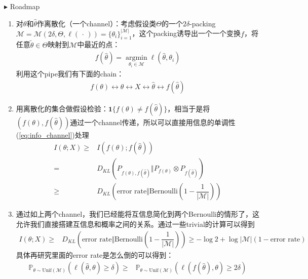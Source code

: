 \documentclass[11pt,a4paper]{ctexart}
\numberwithin{equation}{section}%
\newenvironment{point}{\raggedright$\blacktriangleright$}{}
\begin{document}
\begin{point}
    Roadmap
\end{point}




\begin{enumerate}[topsep=2pt,itemsep=0pt]
    \item 对$ \theta  $和$ \hat{\theta } $作离散化（一个channel）：考虑假设类$ \Theta  $的一个$ 2\delta  $-packing $ \mathcal{M}=\mathcal{M}(2\delta ,\Theta, \ell(\, \cdot \, ))=\{\theta _i\}_{i=1}^{\left\vert \mathcal{M} \right\vert } $，这个packing诱导出一个一个变换$ f $，将任意$ \tilde{\theta }\in\Theta  $映射到$ \mathcal{M} $中最近的点：
    \begin{align*}
        f(\hat{\theta })= \mathop{ \arg\min  }\limits_{\theta _i\in \mathcal{M}} \ell(\hat{\theta },\theta _i)  
    \end{align*}
    利用这个pipe我们有下面的chain：
    \begin{align*}
        f(\theta ) \leftrightarrow \theta \leftrightarrow X \leftrightarrow \hat{\theta } \leftrightarrow f(\hat{\theta }) 
    \end{align*}
    \item 用离散化的集合做假设检验：$ \mathbf{1}\{f(\theta )\neq f(\hat{\theta })\} $，相当于是将$ (f(\theta ),f(\hat{\theta })) $通过一个channel传递，所以可以直接用信息的单调性(\ref{eq:info_channel})处理
    \begin{align*}
        I(\theta ;X)\geq& I(f(\theta ) ;f(\hat{\theta }))\\
        =& D_{KL}(P_{f(\theta ),f(\hat{\theta })}\Vert P_{f(\theta )}\otimes P_{f(\hat{\theta })})\\
        \geq & D_{KL}(\text{error rate}\Vert \mathrm{ Bernoulli }(1-\dfrac{ 1 }{ \left\vert \mathcal{M} \right\vert  }  ))  
    \end{align*}
    \item 通过如上两个channel，我们已经能将互信息简化到两个Bernoulli的情形了，这允许我们直接搭建互信息和概率之间的关系。通过一些trivial的计算可以得到
    \begin{align*}
        I(\theta ;X)\geq&D_{KL}(\text{error rate}\Vert \mathrm{ Bernoulli }(1-\dfrac{ 1 }{ \left\vert \mathcal{M} \right\vert  }  ))  \geq -\log 2 + \log \left\vert \mathcal{M} \right\vert \left(1- \text{error rate}\right)
    \end{align*}
    具体再研究里面的error rate是怎么倒的可以得到：
    \begin{align*}
        \mathbb{P}_{\theta \sim \mathrm{ Unif }(\mathcal{M})}\left( \ell(\hat{\theta },\theta )\geq  \delta \right) \geq & \mathbb{P}_{\theta \sim \mathrm{ Unif }(\mathcal{M})}\left( \ell(f(\hat{\theta }),\theta )\geq 2\delta \right) \\

\end{align*}
\end{enumerate}
\end{document}
